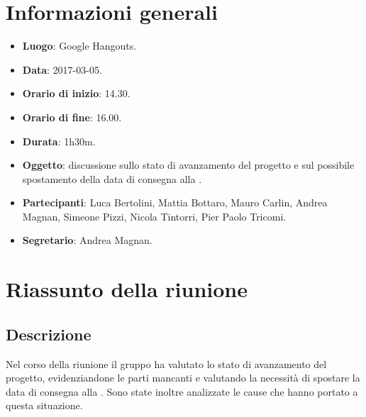 \documentclass[a4paper,titlepage]{article}
\begin{document}
\maketitle
\begin{diario}
\end{diario}
\newpage
\tableofcontents

\newpage
\section{Informazioni generali}
\label{sec:Informazioni}

\begin{itemize}
  \item \textbf{Luogo}: Google Hangouts.
  \item \textbf{Data}: 2017-03-05.
  \item \textbf{Orario di inizio}: 14.30.
  \item \textbf{Orario di fine}: 16.00.
  \item \textbf{Durata}: 1h30m.
  \item \textbf{Oggetto}: discussione sullo stato di avanzamento del progetto e sul possibile spostamento della data di consegna alla \RP{}.
  \item \textbf{Partecipanti}: Luca Bertolini, Mattia Bottaro, Mauro Carlin, Andrea Magnan, Simeone Pizzi, Nicola Tintorri, Pier Paolo Tricomi.
  \item \textbf{Segretario}: Andrea Magnan.

\end{itemize}
\section{Riassunto della riunione}
\label{sec:RiassuntoRiunione}
 \subsection{Descrizione}
Nel corso della riunione il gruppo \GRUPPO{} ha valutato lo stato di avanzamento del progetto, evidenziandone le parti mancanti e valutando la necessità di spostare la data di consegna alla \RP{}. Sono state inoltre analizzate le cause che hanno portato a questa situazione.
\end{document}
